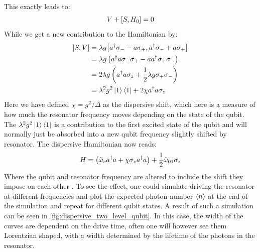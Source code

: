 This exactly leads to:
\begin{equation*}
    V + \comm{S}{H_0} = 0
\end{equation*}
While we get a new contribution to the Hamiltonian by:
\begin{align*}
    \comm{S}{V} &= \lambda g \comm{a^\dagger \sigma_- - a \sigma_+}{a^\dagger \sigma_- + a \sigma_+} \\
                &= \lambda g \left(a^\dagger a \sigma_- \sigma_+ - a a^\dagger \sigma_+ \sigma_-\right) \\
                &= 2 \lambda g \left(a^\dagger a \sigma_z + \frac12 \lambda g \sigma_+\sigma_-\right) \\
                &= \lambda^2 g^2 \ket{1}\bra{1} + 2 \chi a^\dagger a \sigma_z
\end{align*}
Here we have defined $\chi= g^2 / \Delta$ as the dispersive shift, which here is a measure of how much the resonator frequency moves depending on the state of the qubit. The $\lambda^2 g^2 \ket{1}\bra{1}$ is a contribution to the first excited state of the qubit and will normally just be absorbed into a new qubit frequency slightly shifted by resonator. The dispersive Hamiltonian now reads:
\begin{equation}\label{eq:dispersive_shift_tls}
    H = \left(\Tilde{\omega}_r a^\dagger a + \chi \sigma_z a^\dagger a \right)  + \frac12 \Tilde{\omega}_{01} \sigma_z
\end{equation}
Where the qubit and resonator frequency are altered to include the shift they impose on each other \cite{boissonneault_dispersive_2009}. To see the effect, one could simulate driving the resonator at different frequencies and plot the expected photon number $\expval{n}$ at the end of the simulation and repeat for different qubit states. A result of such a simulation can be seen in \ref{fig:dispersive_two_level_qubit}. In this case, the width of the curves are dependent on the drive time, often one will however see them Lorentzian shaped, with a width determined by the lifetime of the photons in the resonator.
